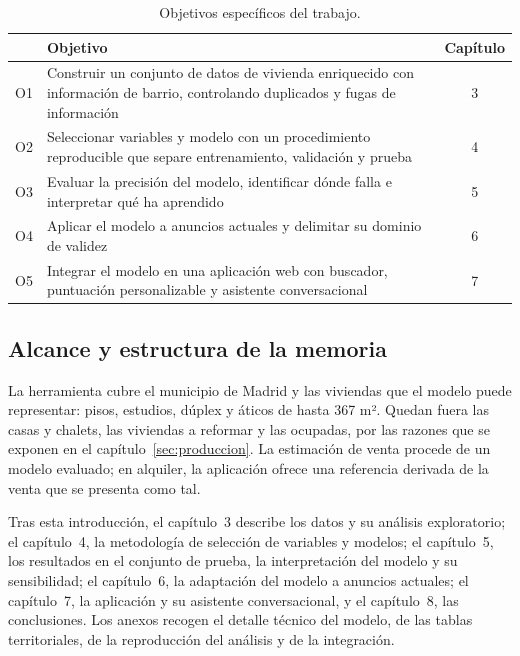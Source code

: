 \documentclass[11pt,a4paper]{article}
\newcommand{\thead}[1]{\textbf{#1}}
\newcounter{anexo}
\begin{document}
\begin{table}[!htb]
\centering
\caption{Objetivos específicos del trabajo.}
\label{tab:objetivos}
\begin{tabularx}{\linewidth}{@{}l L c@{}}
\toprule
& \thead{Objetivo} & \thead{Capítulo} \\
\midrule
O1 & Construir un conjunto de datos de vivienda enriquecido con información de barrio, controlando duplicados y fugas de información & 3 \\
O2 & Seleccionar variables y modelo con un procedimiento reproducible que separe entrenamiento, validación y prueba & 4 \\
O3 & Evaluar la precisión del modelo, identificar dónde falla e interpretar qué ha aprendido & 5 \\
O4 & Aplicar el modelo a anuncios actuales y delimitar su dominio de validez & 6 \\
O5 & Integrar el modelo en una aplicación web con buscador, puntuación personalizable y asistente conversacional & 7 \\
\bottomrule
\end{tabularx}
\end{table}

\subsection{Alcance y estructura de la memoria}

La herramienta cubre el municipio de Madrid y las viviendas que el modelo puede representar: pisos, estudios, dúplex y áticos de hasta 367 m². Quedan fuera las casas y chalets, las viviendas a reformar y las ocupadas, por las razones que se exponen en el capítulo~\ref{sec:produccion}. La estimación de venta procede de un modelo evaluado; en alquiler, la aplicación ofrece una referencia derivada de la venta que se presenta como tal.

Tras esta introducción, el capítulo~3 describe los datos y su análisis exploratorio; el capítulo~4, la metodología de selección de variables y modelos; el capítulo~5, los resultados en el conjunto de prueba, la interpretación del modelo y su sensibilidad; el capítulo~6, la adaptación del modelo a anuncios actuales; el capítulo~7, la aplicación y su asistente conversacional, y el capítulo~8, las conclusiones. Los anexos recogen el detalle técnico del modelo, de las tablas territoriales, de la reproducción del análisis y de la integración.

\end{document}
